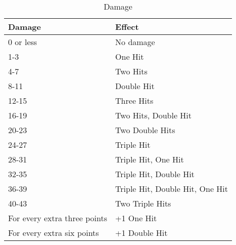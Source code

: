 \begin{table}[H]
  \centering
  \caption{Damage}
  \label{tab:vessel-damage}
  \begin{tabular}{|l|l|}
    \hline
    \textbf{Damage}              & \textbf{Effect}                 \\ \hline
    0 or less                    & No damage                       \\ \hline
    1-3                          & One Hit                         \\ \hline
    4-7                          & Two Hits                        \\ \hline
    8-11                         & Double Hit                      \\ \hline
    12-15                        & Three Hits                      \\ \hline
    16-19                        & Two Hits, Double Hit            \\ \hline
    20-23                        & Two Double Hits                 \\ \hline
    24-27                        & Triple Hit                      \\ \hline
    28-31                        & Triple Hit, One Hit             \\ \hline
    32-35                        & Triple Hit, Double Hit          \\ \hline
    36-39                        & Triple Hit, Double Hit, One Hit \\ \hline
    40-43                        & Two Triple Hits                 \\ \hline
    For every extra three points & +1 One Hit                      \\ \hline
    For every extra six points   & +1 Double Hit                   \\ \hline
  \end{tabular}
\end{table}

